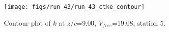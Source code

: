 \begin{figure}[H]
\centering
\texttt{[image: figs/run\_43/run\_43\_ctke\_contour]}
\caption{Contour plot of $k$ at $z/c$=9.00, $V_{free}$=19.08, station 5.}
\label{fig:run_43_ctke_contour}
\end{figure}


